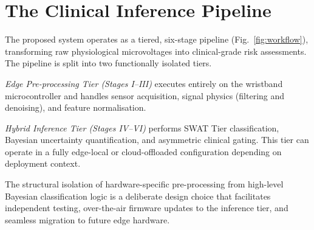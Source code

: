 \documentclass[conference]{IEEEtran}
\begin{document}
\section{The Clinical Inference Pipeline}

The proposed system operates as a tiered, six-stage pipeline
(Fig.~\ref{fig:workflow}), transforming raw physiological microvoltages
into clinical-grade risk assessments.  The pipeline is split into two
functionally isolated tiers.

\textit{Edge Pre-processing Tier (Stages I--III)} executes entirely on
the wristband microcontroller and handles sensor acquisition, signal
physics (filtering and denoising), and feature normalisation.

\textit{Hybrid Inference Tier (Stages IV--VI)} performs SWAT Tier
classification, Bayesian uncertainty quantification, and asymmetric
clinical gating.  This tier can operate in a fully edge-local or
cloud-offloaded configuration depending on deployment context.

The structural isolation of hardware-specific pre-processing from
high-level Bayesian classification logic is a deliberate design choice
that facilitates independent testing, over-the-air firmware updates to
the inference tier, and seamless migration to future edge hardware.
\end{document}
